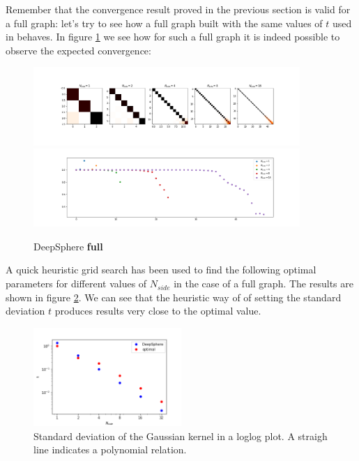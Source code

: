Remember that the convergence result proved in the previous section is valid for a full graph: let's try to see how a full graph built with the same values of $t$ used in \cite{DeepSphere} behaves. 
In figure \ref{fig:DeepSphere_full} we see how for such a full graph it is indeed possible to observe the expected convergence:
\begin{figure}[h]
	\label{fig:DeepSphere_full}
	\caption{DeepSphere \textbf{full}}
	\centering
	\includegraphics[width=0.9\textwidth]{../codes/06_figures/deepsphere_full.png}
	\includegraphics[width=0.9\textwidth]{../codes/06_figures/deepsphere_full_diagonal.png}	
\end{figure}
A quick heuristic grid search has been used to find the following optimal parameters for different values of $N_{side}$ in the case of a full graph. The results are shown in figure \ref{fig:t}. We can see that the heuristic way of \cite{DeepSphere} of setting the standard deviation $t$ produces results very close to the optimal value.

\begin{figure}[h]
	\label{fig:t}
	\caption{Standard deviation of the Gaussian kernel  in a loglog plot. A straigh line indicates a polynomial relation.}
	\centering
	\includegraphics[width=0.5\textwidth]{../codes/06_figures/kernelwidth.png}
\end{figure}

